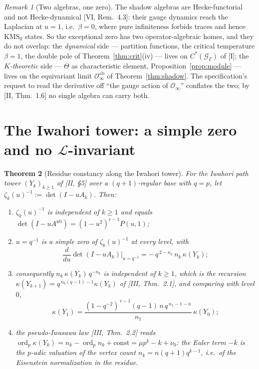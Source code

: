 \documentclass[11pt]{amsart}
\numberwithin{equation}{section}
\newtheorem{theorem}{Theorem}[section]
\theoremstyle{definition}
\theoremstyle{remark}
\newtheorem{remark}[theorem]{Remark}
\newcommand{\cO}{\mathcal{O}}
\newcommand{\cG}{\mathcal{G}}
\newcommand{\cL}{\mathcal{L}}
\newcommand{\ord}{\operatorname{ord}}
\newcommand{\KMS}{\mathrm{KMS}}
\newcommand{\Anb}{A^{\mathrm{nb}}}
\begin{document}
\begin{remark}[Two algebras, one zero]\label{rem:twoalgebras}
The shadow algebras are Hecke-functorial and not Hecke-dynamical [VI, Rem.~4.3]: their
gauge dynamics reach the Laplacian at $u=1$, i.e.\ $\beta=0$, where pure infiniteness
forbids traces and hence $\KMS_0$ states. So the exceptional zero has two
operator-algebraic homes, and they do not overlap: the \emph{dynamical} side ---
partition functions, the critical temperature $\beta=1$, the double pole of
Theorem~\ref{thm:crit}(iv) --- lives on $C^*(\cG_\Gamma)$ of [I]; the
\emph{$K$-theoretic} side --- $\Theta$ as characteristic element,
Proposition~\ref{prop:module} --- lives on the equivariant limit
$\cO_\infty^{\mathrm{ab}}$ of Theorem~\ref{thm:shadow}. The specification's request to
read the derivative off ``the gauge action of $\cO_\infty$'' conflates the two; by [II,
Thm.~1.6] no single algebra can carry both.
\end{remark}

\section{The Iwahori tower: a simple zero and no $\cL$-invariant}\label{sec:iwahori}

\begin{theorem}[Residue constancy along the Iwahori tower]\label{thm:iwahori}
For the Iwahori path tower $(Y_k)_{k\ge1}$ of {\rm[II, \S5]} over a $(q{+}1)$-regular
base with $q=p$, let $\zeta_k(u)^{-1}:=\det(I-uA_k)$. Then:
\begin{enumerate}
\item[(i)] $\zeta_k(u)^{-1}$ is independent of $k\ge1$ and equals
$\det(I-u\Anb)=(1-u^{2})^{r-1}P(u,1)$;
\item[(ii)] $u=q^{-1}$ is a simple zero of $\zeta_k(u)^{-1}$ at every level, with
\[
\frac{d}{du}\det(I-uA_k)\Big|_{u=q^{-1}}=-\,q^{\,2-n_k}\,n_k\,\kappa(Y_k);
\]
\item[(iii)] consequently $n_k\,\kappa(Y_k)\,q^{-n_k}$ is independent of $k\ge1$, which is
the recursion $\kappa(Y_{k+1})=q^{\,n_k(q-1)-1}\kappa(Y_k)$ of {\rm[III, Thm.~2.1]}, and
comparing with level $0$,
\[
\kappa(Y_1)=\frac{(1-q^{-2})^{\,r-1}(q-1)\,n\,q^{\,n_1-1-n}}{n_1}\,\kappa(Y_0);
\]
\item[(iv)] the pseudo-Iwasawa law {\rm[III, Thm.~2.2]} reads
$\ord_p\kappa(Y_k)=n_k-\ord_p n_k+\mathrm{const}=\mu p^{k}-k+\nu_0$: the Euler term $-k$
is the $p$-adic valuation of the vertex count $n_k=n(q{+}1)q^{k-1}$, i.e.\ of the
Eisenstein normalization in the residue.
\end{enumerate}
\end{theorem}
\end{document}
